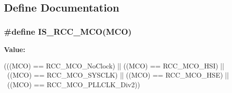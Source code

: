 \subsection{Define Documentation}
\hypertarget{group__Clock__source__to__output__on__MCO__pin_ga0c2d4d6aa8881e01b8c06d8816284b73}{
\subsubsection[{IS\_\-RCC\_\-MCO}]{\setlength{\rightskip}{0pt plus 5cm}\#define IS\_\-RCC\_\-MCO(MCO)}}
\label{group__Clock__source__to__output__on__MCO__pin_ga0c2d4d6aa8881e01b8c06d8816284b73}
{\bfseries Value:}
\begin{DoxyCode}
(((MCO) == RCC_MCO_NoClock) || ((MCO) == RCC_MCO_HSI) || \
                          ((MCO) == RCC_MCO_SYSCLK)  || ((MCO) == RCC_MCO_HSE) ||
       \
                          ((MCO) == RCC_MCO_PLLCLK_Div2))
\end{DoxyCode}
